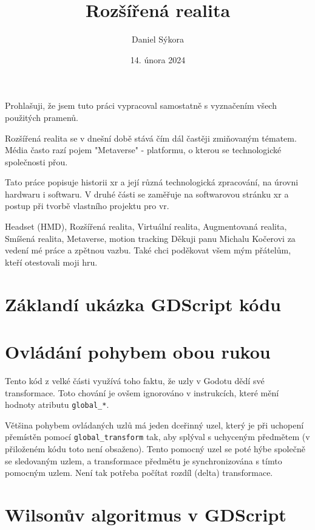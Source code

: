 \documentclass[12pt]{report}
\author{Daniel Sýkora}
\title{Rozšířená realita}
\date{14. února 2024}
\begin{document}
\mytitlepage
\prohlaseni
{
	Prohlašuji, že jsem tuto práci vypracoval samostatně s vyznačením všech použitých pramenů.
}
\abstrakt
{ %
	Rozšířená realita se v dnešní době stává čím dál častěji zmiňovaným tématem. Média často razí pojem "Metaverse" - platformu, o kterou se technologické společnosti přou.

	Tato práce popisuje historii \gls{xr} a její různá technologická zpracování, na úrovni hardwaru i softwaru. V druhé části se zaměřuje na softwarovou stránku \gls{xr} a postup při tvorbě vlastního projektu pro \gls{vr}.
}
{ %
	Headset (HMD), Rozšířená realita, Virtuální realita, Augmentovaná realita, Smíšená realita, Metaverse, motion tracking
}
\podekovani
{
	Děkuji panu Michalu Kočerovi za vedení mé práce a zpětnou vazbu. Také chci poděkovat všem mým přátelům, kteří otestovali moji hru.
}

\tableofcontents
\newpage






\nocite{*}

\printbibliography

\printglossary[title={Zkratky}]

\listoffigures
{}

\appendix

\chapter{Záklandí ukázka GDScript kódu}\label{apx_gscript_sample}


\chapter{Ovládání pohybem obou rukou}\label{apx_gripped_object_transformation}
Tento kód z velké části využívá toho faktu, že uzly v Godotu dědí své transformace. Toto chování je ovšem ignorováno v instrukcích, které mění hodnoty atributu \texttt{global\_*}.

Většina pohybem ovládaných uzlů má jeden dceřinný uzel, který je při uchopení přemístěn pomocí \texttt{global\_transform} tak, aby splýval s uchyceným předmětem (v přiloženém kódu toto není obsaženo). Tento pomocný uzel se poté hýbe společně se sledovaným uzlem, a transformace předmětu je synchronizována s tímto pomocným uzlem. Není tak potřeba počítat rozdíl (delta) transformace.



\chapter{Wilsonův algoritmus v GDScript}\label{apx_mazegen}

\end{document}

